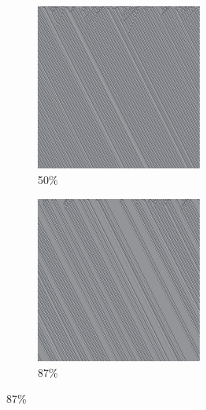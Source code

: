 \documentclass[12pt, fleqn]{report}                             %
\theoremstyle{break}                                            %
\begin{document}
\begin{figure}[ht!]
\begin{subfigure}[b]{0.4\linewidth}
          \includegraphics[width=0.6\textwidth]{Images/25/c.png}
          \caption{50\%}
        \end{subfigure}
        \begin{subfigure}[b]{0.4\linewidth}
          \includegraphics[width=0.6\textwidth]{Images/25/d.png}
          \caption{87\%}
        \end{subfigure}
      \end{figure}
\end{document}
